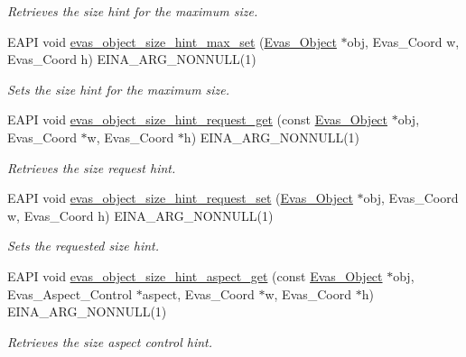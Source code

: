 \begin{DoxyCompactItemize}
\begin{DoxyCompactList}\small\item\em Retrieves the size hint for the maximum size. \item\end{DoxyCompactList}\item 
EAPI void \hyperlink{group__Evas__Object__Group__Size__Hints_ga2a224fd6c4fc231af281af59c5a604b2}{evas\_\-object\_\-size\_\-hint\_\-max\_\-set} (\hyperlink{group__Evas__Object__Group_ga9e19e6dd1f517a0ba437c0114d3e7c97}{Evas\_\-Object} $\ast$obj, Evas\_\-Coord w, Evas\_\-Coord h) EINA\_\-ARG\_\-NONNULL(1)
\begin{DoxyCompactList}\small\item\em Sets the size hint for the maximum size. \item\end{DoxyCompactList}\item 
EAPI void \hyperlink{group__Evas__Object__Group__Size__Hints_ga6a7de6942258ab03a6e85b37f569895d}{evas\_\-object\_\-size\_\-hint\_\-request\_\-get} (const \hyperlink{group__Evas__Object__Group_ga9e19e6dd1f517a0ba437c0114d3e7c97}{Evas\_\-Object} $\ast$obj, Evas\_\-Coord $\ast$w, Evas\_\-Coord $\ast$h) EINA\_\-ARG\_\-NONNULL(1)
\begin{DoxyCompactList}\small\item\em Retrieves the size request hint. \item\end{DoxyCompactList}\item 
EAPI void \hyperlink{group__Evas__Object__Group__Size__Hints_gace0177af29ccbf1a60415f2c4c85c1f4}{evas\_\-object\_\-size\_\-hint\_\-request\_\-set} (\hyperlink{group__Evas__Object__Group_ga9e19e6dd1f517a0ba437c0114d3e7c97}{Evas\_\-Object} $\ast$obj, Evas\_\-Coord w, Evas\_\-Coord h) EINA\_\-ARG\_\-NONNULL(1)
\begin{DoxyCompactList}\small\item\em Sets the requested size hint. \item\end{DoxyCompactList}\item 
EAPI void \hyperlink{group__Evas__Object__Group__Size__Hints_ga7b31c73dcbf60cdafe6ad7ffae42a54c}{evas\_\-object\_\-size\_\-hint\_\-aspect\_\-get} (const \hyperlink{group__Evas__Object__Group_ga9e19e6dd1f517a0ba437c0114d3e7c97}{Evas\_\-Object} $\ast$obj, Evas\_\-Aspect\_\-Control $\ast$aspect, Evas\_\-Coord $\ast$w, Evas\_\-Coord $\ast$h) EINA\_\-ARG\_\-NONNULL(1)
\begin{DoxyCompactList}\small\item\em Retrieves the size aspect control hint. \item\end{DoxyCompactList}\item 

\end{DoxyCompactItemize}
